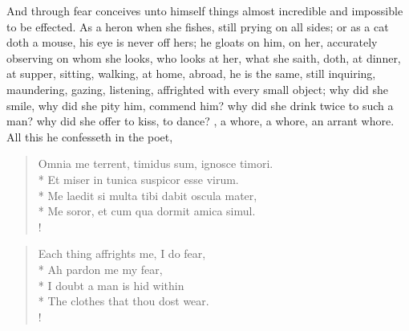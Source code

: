 And through fear conceives unto himself things almost incredible and
impossible to be effected. As a heron when she fishes, still prying on
all sides; or as a cat doth a mouse, his eye is never off hers; he
gloats on him, on her, accurately observing on whom she looks, who
looks at her, what she saith, doth, at dinner, at supper, sitting,
walking, at home, abroad, he is the same, still inquiring, maundering,
gazing, listening, affrighted with every small object; why did she
smile, why did she pity him, commend him? why did she drink twice to
such a man? why did she offer to kiss, to dance? \etc{}, a whore, a whore,
an arrant whore. All this he confesseth in the poet, %
%
\begin{latin}%
\begin{verse}%
Omnia me terrent, timidus sum, ignosce timori.\\*
Et miser in tunica suspicor esse virum.\\*
Me laedit si multa tibi dabit oscula mater,\\*
Me soror, et cum qua dormit amica simul.\\!
\end{verse}%
\end{latin}%
\translationrule%
\begin{verse}%
Each thing affrights me, I do fear,\\*
Ah pardon me my fear,\\*
I doubt a man is hid within\\*
The clothes that thou dost wear.\\!
\end{verse}%

